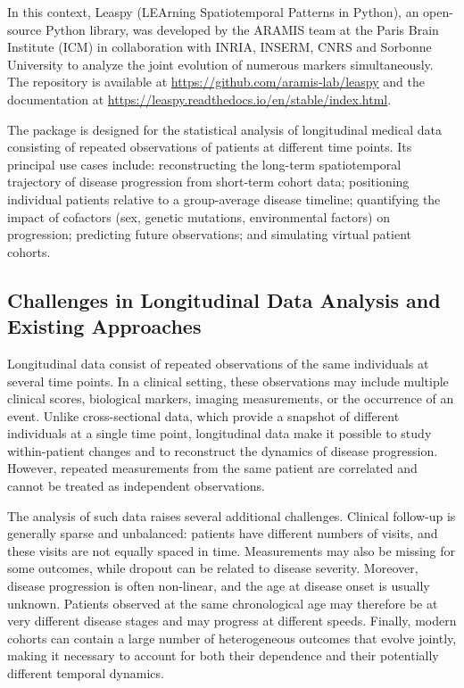 \documentclass{rapportCS}
\begin{document}
In this context, Leaspy (LEArning Spatiotemporal Patterns in Python), an open-source Python library, was developed by the ARAMIS team at the Paris Brain Institute (ICM) in collaboration with INRIA, INSERM, CNRS and Sorbonne University to analyze the joint evolution of numerous markers simultaneously. The repository is available at \url{https://github.com/aramis-lab/leaspy} and the documentation at \url{https://leaspy.readthedocs.io/en/stable/index.html}. 

The package is designed for the statistical analysis of longitudinal medical data consisting of repeated observations of patients at different time points. Its principal use cases include: reconstructing the long-term spatiotemporal trajectory of disease progression from short-term cohort data; positioning individual patients relative to a group-average disease timeline; quantifying the impact of cofactors (sex, genetic mutations, environmental factors) on progression; predicting future observations; and simulating virtual patient cohorts.

\subsection{Challenges in Longitudinal Data Analysis and Existing Approaches}

Longitudinal data consist of repeated observations of the same individuals at several time points. In a clinical setting, these observations may include multiple clinical scores, biological markers, imaging measurements, or the occurrence of an event. Unlike cross-sectional data, which provide a snapshot of different individuals at a single time point, longitudinal data make it possible to study within-patient changes and to reconstruct the dynamics of disease progression. However, repeated measurements from the same patient are correlated and cannot be treated as independent observations.

The analysis of such data raises several additional challenges. Clinical follow-up is generally sparse and unbalanced: patients have different numbers of visits, and these visits are not equally spaced in time. Measurements may also be missing for some outcomes, while dropout can be related to disease severity. Moreover, disease progression is often non-linear, and the age at disease onset is usually unknown. Patients observed at the same chronological age may therefore be at very different disease stages and may progress at different speeds. Finally, modern cohorts can contain a large number of heterogeneous outcomes that evolve jointly, making it necessary to account for both their dependence and their potentially different temporal dynamics.
 
\end{document}
